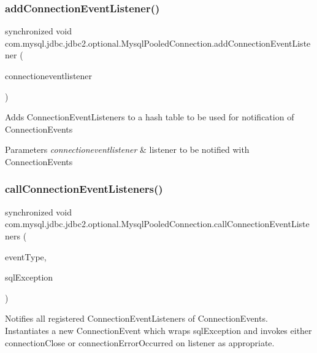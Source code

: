 \subsubsection{\texorpdfstring{add\+Connection\+Event\+Listener()}{addConnectionEventListener()}}
{\footnotesize\ttfamily synchronized void com.\+mysql.\+jdbc.\+jdbc2.\+optional.\+Mysql\+Pooled\+Connection.\+add\+Connection\+Event\+Listener (\begin{DoxyParamCaption}\item[{Connection\+Event\+Listener}]{connectioneventlistener }\end{DoxyParamCaption})}

Adds Connection\+Event\+Listeners to a hash table to be used for notification of Connection\+Events


\begin{DoxyParams}{Parameters}
{\em connectioneventlistener} & listener to be notified with Connection\+Events \\
\hline
\end{DoxyParams}
\mbox{\label{classcom_1_1mysql_1_1jdbc_1_1jdbc2_1_1optional_1_1_mysql_pooled_connection_aeef444cea48fb46a831d6f7f6b7a6bf9}} 
\subsubsection{\texorpdfstring{call\+Connection\+Event\+Listeners()}{callConnectionEventListeners()}}
{\footnotesize\ttfamily synchronized void com.\+mysql.\+jdbc.\+jdbc2.\+optional.\+Mysql\+Pooled\+Connection.\+call\+Connection\+Event\+Listeners (\begin{DoxyParamCaption}\item[{int}]{event\+Type,  }\item[{S\+Q\+L\+Exception}]{sql\+Exception }\end{DoxyParamCaption})\hspace{0.3cm}{\ttfamily [protected]}}

Notifies all registered Connection\+Event\+Listeners of Connection\+Events. Instantiates a new Connection\+Event which wraps sql\+Exception and invokes either connection\+Close or connection\+Error\+Occurred on listener as appropriate.


